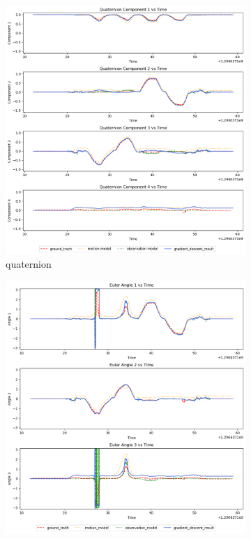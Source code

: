 \documentclass[conference]{IEEEtran}
\begin{document}
\begin{figure}[h]
    \centering
    \begin{subfigure}{0.4\textwidth}
        \includegraphics[width=\linewidth]{../img/2_qt.png}
        \caption{quaternion}
        \label{fig:2qt}
    \end{subfigure}
    \hfill
    \begin{subfigure}{0.4\textwidth}
        \includegraphics[width=\linewidth]{../img/2_ea.png}

\end{subfigure}
\end{figure}
\end{document}
